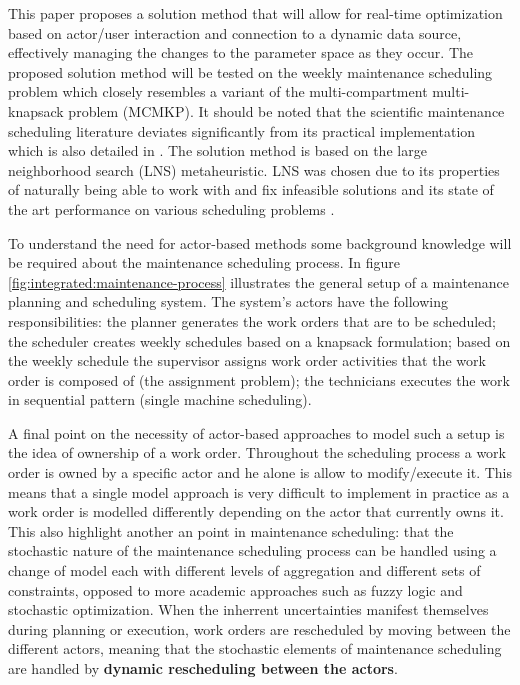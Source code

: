 This paper proposes a solution method that will allow for real-time optimization
based on actor/user interaction and connection to a dynamic data source,
effectively managing the changes to the parameter space as they occur. The proposed solution
method will be tested on the weekly maintenance scheduling problem \citet{palmerMaintenancePlanningScheduling2019} 
which closely resembles a variant of the multi-compartment multi-knapsack problem (MCMKP). It
should be noted that the scientific maintenance scheduling literature deviates
significantly from its practical implementation which is also detailed in
\citep{palmerMaintenancePlanningScheduling2019}. The solution method is
based on the large neighborhood search (LNS) metaheuristic. LNS 
was chosen due to its properties of naturally being able to work with and fix
infeasible solutions and its state of the art performance on various scheduling
problems \citep{gendreauHandbookMetaheuristics2019}. 

To understand the need for actor-based methods some
background knowledge will be required about the maintenance scheduling process.
In figure \ref{fig:integrated:maintenance-process} illustrates the general setup
of a maintenance planning and scheduling system. The system's actors
have the following responsibilities: the planner generates the work orders that
are to be scheduled; the scheduler creates weekly schedules based on a knapsack
formulation; based on the weekly schedule the supervisor assigns work order
activities that the work order is composed of (the assignment problem); the
technicians executes the work in sequential pattern (single machine scheduling).

A final point on the necessity of actor-based approaches to model such a setup
is the idea of ownership of a work order. Throughout the scheduling process a
work order is owned by a specific actor and he alone is allow to modify/execute it. This
means that a single model approach is very difficult to implement in practice
as a work order is modelled differently depending on the actor that currently
owns it. This also highlight another an point in maintenance scheduling: that
the stochastic nature of the maintenance scheduling process can be handled using
a change of model each with different levels of aggregation and different sets
of constraints, opposed to more academic approaches such as fuzzy logic and
stochastic optimization. When the inherrent uncertainties manifest themselves
during planning or execution, work orders are rescheduled by moving between
the different actors, meaning that the stochastic elements of maintenance
scheduling are handled by \textbf{dynamic rescheduling between the actors}.

